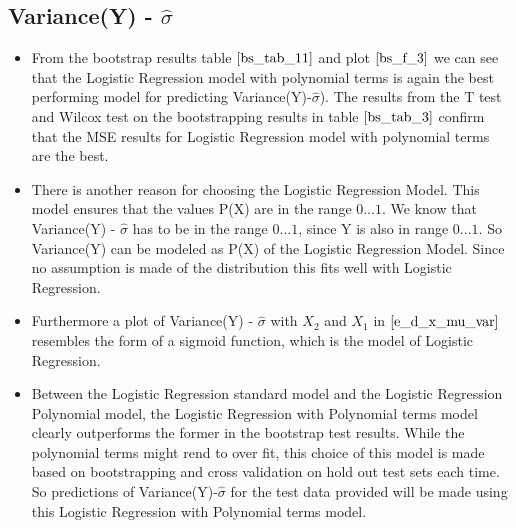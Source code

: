 \documentclass[twoside,12pt]{article}
\begin{document}
\subsection{Variance(Y) - $\hat{\sigma}$}
\FloatBarrier
\begin{itemize}
\item
From the bootstrap results table $\eqref{bs_tab_11}$ and plot $\eqref{bs_f_3}$ we can see that the Logistic Regression model with polynomial terms is again the best performing model for predicting Variance(Y)-$\hat{\sigma}$). The results from the T test and Wilcox test on the bootstrapping results in table $\eqref{bs_tab_3}$ confirm that the MSE results for  Logistic Regression model with polynomial terms are the best.
\item
There is another reason for choosing the Logistic Regression Model. This model ensures that the values P(X) are in the range $0 \dots 1$. We know that Variance(Y) - $\hat{\sigma}$ has to be in the range $0 \dots 1$, since Y is also in range $0\dots 1$. So Variance(Y) can be modeled as P(X) of the Logistic Regression Model. Since no assumption is made of the distribution this fits well with Logistic Regression.
\item
Furthermore a plot of Variance(Y) - $\hat{\sigma}$ with $X_2$ and $X_1$ in $\eqref{e_d_x_mu_var}$ resembles the form of a sigmoid function, which is the model of Logistic Regression.
\item
Between the Logistic Regression standard model and the Logistic Regression Polynomial model, the Logistic Regression with Polynomial terms model clearly outperforms the former in the bootstrap test results. While the polynomial terms might rend to over fit, this choice of this model is made based on bootstrapping and cross validation on hold out test sets each time. So predictions of Variance(Y)-$\hat{\sigma}$ for the test data provided will be made using this Logistic Regression with Polynomial terms model.
\end{itemize}


\FloatBarrier
\end{document}
